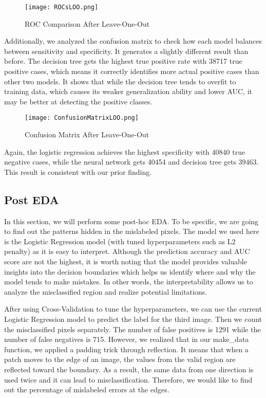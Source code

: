 \documentclass[10pt,letterpaper]{article}
\begin{document}
\begin{figure}[htbp]
    \centering
    \texttt{[image: ROCsLOO.png]}
    \caption{ROC Comparison After Leave-One-Out}
\end{figure}

Additionally, we analyzed the confusion matrix to check how each model balances between sensitivity and specificity. It generates a slightly different result than before. The decision tree gets the highest true positive rate with 38717 true positive cases, which means it correctly identifies more actual positive cases than other two models. It shows that while the decision tree tends to overfit to training data, which causes its weaker generalization ability and lower AUC, it may be better at detecting the positive classes.

\begin{figure}[htbp]
    \centering
    \texttt{[image: ConfusionMatrixLOO.png]}
    \caption{Confusion Matrix After Leave-One-Out}
    \label{fig:enter-label}
\end{figure}

Again, the logistic regression achieves the highest specificity with 40840 true negative cases, while the neural network gets 40454 and decision tree gets 39463. This result is consistent with our prior finding.



\subsection{Post EDA}

In this section, we will perform some post-hoc EDA. To be specific, we are going to find out the patterns hidden in the mislabeled pixels. The model we used here is the Logistic Regression model (with tuned hyperparameters such as L2 penalty) as it is easy to interpret. Although the prediction accuracy and AUC score are not the highest, it is worth noting that the model provides valuable insights into the decision boundaries which helps us identify where and why the model tends to make mistakes. In other words, the interpretability allows us to analyze the misclassified region and realize potential limitations.

After using Cross-Validation to tune the hyperparameters, we can use the current Logistic Regression model to predict the label for the third image. Then we count the misclassified pixels separately. The number of false positives is 1291 while the number of false negatives is 715. However, we realized that in our make\_data function, we applied a padding trick through reflection. It means that when a patch moves to the edge of an image, the values from the valid region are reflected toward the boundary. As a result, the same data from one direction is used twice and it can lead to misclassification. Therefore, we would like to find out the percentage of mislabeled errors at the edges.
\end{document}
